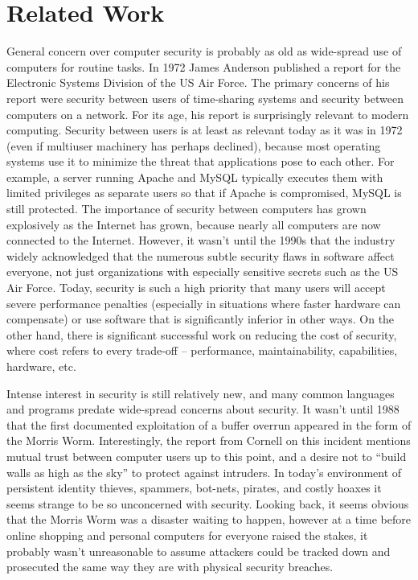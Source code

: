 \section{Related Work}

General concern over computer security is probably as old as wide-spread use of computers for routine tasks.  In 1972 James
Anderson published a report for the Electronic Systems Division of the US Air Force\cite{1972anderson}.  The primary
concerns of his report were security between users of time-sharing systems and security between computers on a network.
For its age, his report is surprisingly relevant to modern computing.  Security between users is at least as relevant
today as it was in 1972 (even if multiuser machinery has perhaps declined), because most operating systems use it to
minimize the threat that applications pose to each other.  For example, a server running Apache and MySQL typically
executes them with limited privileges as separate users so that if Apache is compromised, MySQL is still protected.
The importance of security between computers has grown explosively as the Internet has grown, because nearly all
computers are now connected to the Internet.  However, it wasn't until the 1990s that the industry widely acknowledged
that the numerous subtle security flaws in software affect everyone, not just organizations with especially sensitive
secrets such as the US Air Force.  Today, security is such a high priority that many users will accept severe
performance penalties (especially in situations where faster hardware can compensate) or use software that is
significantly inferior in other ways.  On the other hand, there is significant successful work on reducing the cost of
security, where cost refers to every trade-off -- performance, maintainability, capabilities, hardware, etc.

Intense interest in security is still relatively new, and many common languages and programs predate wide-spread
concerns about security.  It wasn't until 1988 that the first documented exploitation of a buffer overrun appeared in the form of the Morris
Worm.  Interestingly, the report from Cornell on this incident\cite{1989eisenberg} mentions mutual trust between
computer users up to this point, and a desire not to ``build walls as high as the sky'' to protect against intruders.
In today's environment of persistent identity thieves, spammers, bot-nets, pirates, and costly hoaxes it seems
strange to be so unconcerned with security.  Looking back, it seems obvious that the Morris Worm was a disaster waiting to happen,
however at a time before online shopping and personal computers for everyone raised the stakes, it probably wasn't
unreasonable to assume attackers could be tracked down and prosecuted the same way they are with physical security
breaches.

